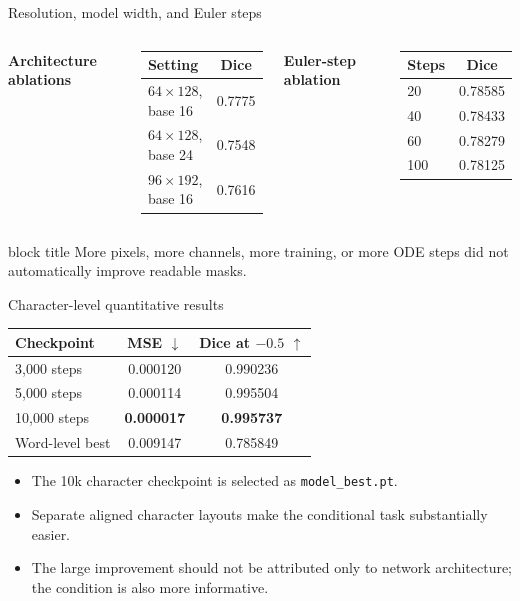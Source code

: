 \documentclass[aspectratio=169,xcolor=svgnames]{beamer}
\newcommand{\keypoint}[1]{%
\begin{center}
\begin{beamercolorbox}[rounded=true,shadow=true,wd=0.88\textwidth,sep=0.6em,center]{block title}
#1
\end{beamercolorbox}
\end{center}
}
\begin{document}
\begin{frame}{Resolution, model width, and Euler steps}
\begin{columns}[T]
\textbf{Architecture ablations}
\begin{center}
\begin{tabular}{lc}
\hline
Setting & Dice \\
\hline
$64\times128$, base 16 & 0.7775 \\
$64\times128$, base 24 & 0.7548 \\
$96\times192$, base 16 & 0.7616 \\
\hline
\end{tabular}
\end{center}

\textbf{Euler-step ablation}
\begin{center}
\begin{tabular}{lc}
\hline
Steps & Dice \\
\hline
20 & 0.78585 \\
40 & 0.78433 \\
60 & 0.78279 \\
100 & 0.78125 \\
\hline
\end{tabular}
\end{center}
\end{columns}

\keypoint{More pixels, more channels, more training, or more ODE steps did not automatically improve readable masks.}
\end{frame}

\begin{frame}{Character-level quantitative results}
\begin{center}
\begin{tabular}{lcc}
\hline
Checkpoint & MSE $\downarrow$ & Dice at $-0.5$ $\uparrow$ \\
\hline
3,000 steps & 0.000120 & 0.990236 \\
5,000 steps & 0.000114 & 0.995504 \\
10,000 steps & \textbf{0.000017} & \textbf{0.995737} \\
\hline
Word-level best & 0.009147 & 0.785849 \\
\hline
\end{tabular}
\end{center}

\begin{itemize}
    \item The 10k character checkpoint is selected as \texttt{model\_best.pt}.
    \item Separate aligned character layouts make the conditional task substantially easier.
    \item The large improvement should not be attributed only to network architecture; the condition is also more informative.
\end{itemize}
\end{frame}
\end{document}
